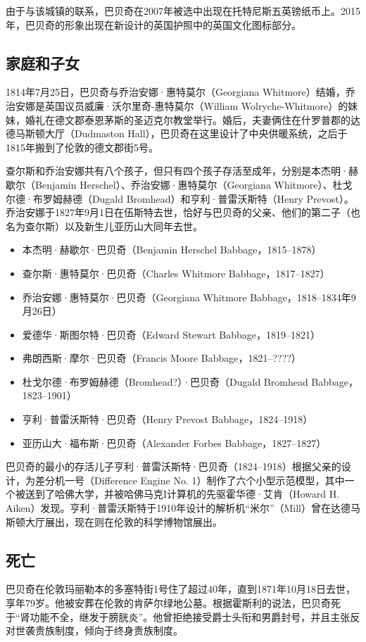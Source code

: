由于与该城镇的联系，巴贝奇在2007年被选中出现在托特尼斯五英镑纸币上。2015年，巴贝奇的形象出现在新设计的英国护照中的英国文化图标部分。
\subsection{家庭和子女} 
1814年7月25日，巴贝奇与乔治安娜·惠特莫尔（Georgiana Whitmore）结婚，乔治安娜是英国议员威廉·沃尔里奇-惠特莫尔（William Wolryche-Whitmore）的妹妹，婚礼在德文郡泰恩茅斯的圣迈克尔教堂举行。婚后，夫妻俩住在什罗普郡的达德马斯顿大厅（Dudmaston Hall），巴贝奇在这里设计了中央供暖系统，之后于1815年搬到了伦敦的德文郡街5号。

查尔斯和乔治安娜共有八个孩子，但只有四个孩子存活至成年，分别是本杰明·赫歇尔（Benjamin Herschel）、乔治安娜·惠特莫尔（Georgiana Whitmore）、杜戈尔德·布罗姆赫德（Dugald Bromhead）和亨利·普雷沃斯特（Henry Prevost）。乔治安娜于1827年9月1日在伍斯特去世，恰好与巴贝奇的父亲、他们的第二子（也名为查尔斯）以及新生儿亚历山大同年去世。
\begin{itemize}
\item 本杰明·赫歇尔·巴贝奇（Benjamin Herschel Babbage，1815–1878）
\item 查尔斯·惠特莫尔·巴贝奇（Charles Whitmore Babbage，1817–1827）
\item 乔治安娜·惠特莫尔·巴贝奇（Georgiana Whitmore Babbage，1818–1834年9月26日）
\item 爱德华·斯图尔特·巴贝奇（Edward Stewart Babbage，1819–1821）
\item 弗朗西斯·摩尔·巴贝奇（Francis Moore Babbage，1821–????）
\item 杜戈尔德·布罗姆赫德（Bromhead?）·巴贝奇（Dugald Bromhead Babbage，1823–1901）
\item 亨利·普雷沃斯特·巴贝奇（Henry Prevost Babbage，1824–1918）
\item 亚历山大·福布斯·巴贝奇（Alexander Forbes Babbage，1827–1827）
\end{itemize}
巴贝奇的最小的存活儿子亨利·普雷沃斯特·巴贝奇（1824–1918）根据父亲的设计，为差分机一号（Difference Engine No. 1）制作了六个小型示范模型，其中一个被送到了哈佛大学，并被哈佛马克I计算机的先驱霍华德·艾肯（Howard H. Aiken）发现。亨利·普雷沃斯特于1910年设计的解析机“米尔”（Mill）曾在达德马斯顿大厅展出，现在则在伦敦的科学博物馆展出。
\subsection{死亡}
巴贝奇在伦敦玛丽勒本的多塞特街1号住了超过40年，直到1871年10月18日去世，享年79岁。他被安葬在伦敦的肯萨尔绿地公墓。根据霍斯利的说法，巴贝奇死于“肾功能不全，继发于膀胱炎”。他曾拒绝接受爵士头衔和男爵封号，并且主张反对世袭贵族制度，倾向于终身贵族制度。
